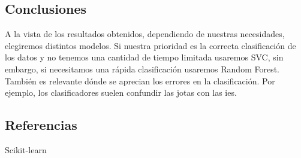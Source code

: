 \documentclass[8pt,a4paper]{article}
\begin{document}
\subsection{Conclusiones}
A la vista de los resultados obtenidos, dependiendo de nuestras necesidades, elegiremos distintos modelos. Si nuestra prioridad es la correcta clasificación de los datos y no tenemos
una cantidad de tiempo limitada usaremos SVC, sin embargo, si necesitamos una rápida clasificación usaremos Random Forest. También es relevante dónde se aprecian los errores en la clasificación. Por ejemplo, los clasificadores suelen confundir las jotas con las ies.

\subsection{Referencias}
Scikit-learn
\end{document}
